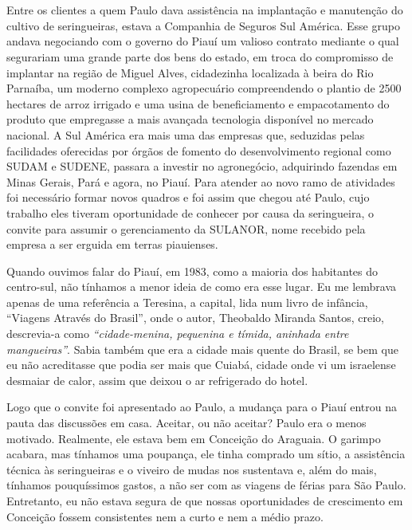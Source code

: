 \chapter{}
Entre os clientes a quem Paulo dava assistência na implantação e manutenção do cultivo de seringueiras, estava a Companhia de Seguros Sul América.
Esse grupo andava negociando com o governo do Piauí um valioso contrato mediante o qual segurariam uma grande parte dos bens do estado, em troca do compromisso de implantar na região de Miguel Alves, cidadezinha localizada à beira do Rio Parnaíba, um moderno complexo agropecuário compreendendo o plantio de 2500 hectares de arroz irrigado e uma usina de beneficiamento e empacotamento do produto que empregasse a mais avançada tecnologia disponível no mercado nacional.
A Sul América era mais uma das empresas que, seduzidas pelas facilidades oferecidas por órgãos de fomento do desenvolvimento regional como SUDAM e SUDENE, passara a investir no agronegócio, adquirindo fazendas em Minas Gerais, Pará e agora, no Piauí.
Para atender ao novo ramo de atividades foi necessário formar novos quadros e foi assim que chegou até Paulo, cujo trabalho eles tiveram oportunidade de conhecer por causa da seringueira, o convite para assumir o gerenciamento da SULANOR, nome recebido pela empresa a ser erguida em terras piauienses.

Quando ouvimos falar do Piauí, em 1983, como a maioria dos habitantes do centro-sul, não tínhamos a menor ideia de como era esse lugar.
Eu me lembrava apenas de uma referência a Teresina, a capital, lida num livro de infância, ``Viagens Através do Brasil'', onde o autor, Theobaldo Miranda Santos, creio, descrevia-a como \textit{``cidade-menina, pequenina e tímida, aninhada entre mangueiras''}. Sabia também que era a cidade mais quente do Brasil, se bem que eu não acreditasse que podia ser mais que Cuiabá, cidade onde vi um israelense desmaiar de calor, assim que deixou o ar refrigerado do hotel.

Logo que o convite foi apresentado ao Paulo, a mudança para o Piauí entrou na pauta das discussões em casa.
Aceitar, ou não aceitar? Paulo era o menos motivado.
Realmente, ele estava bem em Conceição do Araguaia.
O garimpo acabara, mas tínhamos uma poupança, ele tinha comprado um sítio, a assistência técnica às seringueiras e o viveiro de mudas nos sustentava e, além do mais, tínhamos pouquíssimos gastos, a não ser com as viagens de férias para São Paulo.
Entretanto, eu não estava segura de que nossas oportunidades de crescimento em Conceição fossem consistentes nem a curto e nem a médio prazo.


